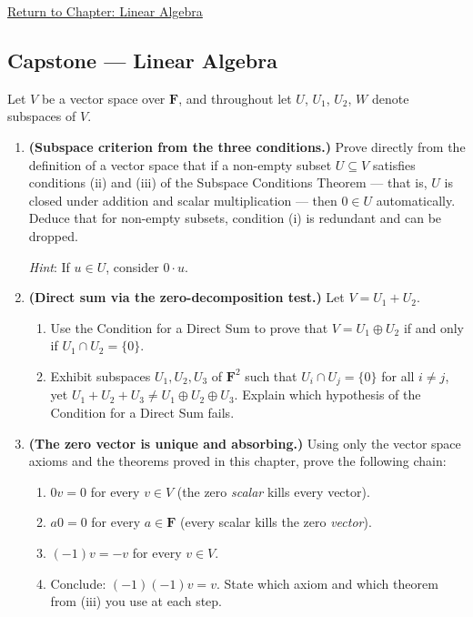 \newpage
{}
\label{prf:capstone-linear-algebra}

\begin{remark*}[Return]
\hyperref[chap:linear-algebra]{Return to Chapter: Linear Algebra}
\end{remark*}

\subsection*{Capstone --- Linear Algebra}

\begin{remark*}
Let $V$ be a vector space over $\mathbf{F}$, and throughout let $U$, $U_1$,
$U_2$, $W$ denote subspaces of $V$.

\begin{enumerate}[label=(\alph*)]

\item \textbf{(Subspace criterion from the three conditions.)}
Prove directly from the definition of a vector space that if a non-empty subset
$U \subseteq V$ satisfies conditions (ii) and (iii) of the Subspace Conditions
Theorem --- that is, $U$ is closed under addition and scalar multiplication ---
then $0 \in U$ automatically. Deduce that for non-empty subsets, condition (i)
is redundant and can be dropped.

\textit{Hint}: If $u \in U$, consider $0 \cdot u$.

\item \textbf{(Direct sum via the zero-decomposition test.)}
Let $V = U_1 + U_2$.
\begin{enumerate}[label=(\roman*)]
  \item Use the Condition for a Direct Sum to prove that $V = U_1 \oplus U_2$
        if and only if $U_1 \cap U_2 = \{0\}$.
  \item Exhibit subspaces $U_1, U_2, U_3$ of $\mathbf{F}^2$ such that
        $U_i \cap U_j = \{0\}$ for all $i \neq j$, yet
        $U_1 + U_2 + U_3 \neq U_1 \oplus U_2 \oplus U_3$.
        Explain which hypothesis of the Condition for a Direct Sum fails.
\end{enumerate}

\item \textbf{(The zero vector is unique and absorbing.)}
Using only the vector space axioms and the theorems proved in this chapter,
prove the following chain:
\begin{enumerate}[label=(\roman*)]
  \item $0v = 0$ for every $v \in V$ (the zero \emph{scalar} kills every vector).
  \item $a0 = 0$ for every $a \in \mathbf{F}$ (every scalar kills the zero \emph{vector}).
  \item $(-1)v = -v$ for every $v \in V$.
  \item Conclude: $(-1)(-1)v = v$. State which axiom and which theorem from (iii)
        you use at each step.
\end{enumerate}


\end{enumerate}
\end{remark*}
